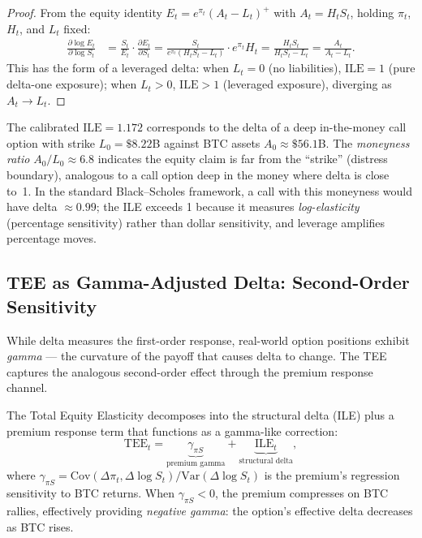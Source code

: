 \begin{proof}
From the equity identity $E_t = e^{\pi_t}(A_t - L_t)^+$ with $A_t = H_t S_t$, holding $\pi_t$, $H_t$, and $L_t$ fixed:
\begin{align*}
  \frac{\partial \log E_t}{\partial \log S_t} &= \frac{S_t}{E_t} \cdot \frac{\partial E_t}{\partial S_t} = \frac{S_t}{e^{\pi_t}(H_t S_t - L_t)} \cdot e^{\pi_t} H_t = \frac{H_t S_t}{H_t S_t - L_t} = \frac{A_t}{A_t - L_t}.
\end{align*}
This has the form of a leveraged delta: when $L_t = 0$ (no liabilities), $\mathrm{ILE} = 1$ (pure delta-one exposure); when $L_t > 0$, $\mathrm{ILE} > 1$ (leveraged exposure), diverging as $A_t \to L_t$.
\end{proof}

\begin{remark}
\label{rem:ile_calibrated}
The calibrated $\mathrm{ILE} = 1.172$ corresponds to the delta of a deep in-the-money call option with strike $L_0 = \$8.22$B against BTC assets $A_0 \approx \$56.1$B. The \emph{moneyness ratio} $A_0/L_0 \approx 6.8$ indicates the equity claim is far from the ``strike'' (distress boundary), analogous to a call option deep in the money where delta is close to~1. In the standard Black--Scholes framework, a call with this moneyness would have delta $\approx 0.99$; the ILE exceeds 1 because it measures \emph{log-elasticity} (percentage sensitivity) rather than dollar sensitivity, and leverage amplifies percentage moves.
\end{remark}

\subsection{TEE as Gamma-Adjusted Delta: Second-Order Sensitivity}
\label{subsec:tee_gamma}

While delta measures the first-order response, real-world option positions exhibit \emph{gamma} --- the curvature of the payoff that causes delta to change. The TEE captures the analogous second-order effect through the premium response channel.

\begin{proposition}
\label{prop:tee_gamma}
The Total Equity Elasticity decomposes into the structural delta (ILE) plus a premium response term that functions as a gamma-like correction:
\begin{equation}
\label{eq:tee_decomp}
  \mathrm{TEE}_t = \underbrace{\gamma_{\pi S}}_{\text{premium gamma}} + \underbrace{\mathrm{ILE}_t}_{\text{structural delta}},
\end{equation}
where $\gamma_{\pi S} = \mathrm{Cov}(\Delta\pi_t, \Delta\log S_t) / \mathrm{Var}(\Delta\log S_t)$ is the premium's regression sensitivity to BTC returns. When $\gamma_{\pi S} < 0$, the premium compresses on BTC rallies, effectively providing \emph{negative gamma}: the option's effective delta decreases as BTC rises.
\end{proposition}

